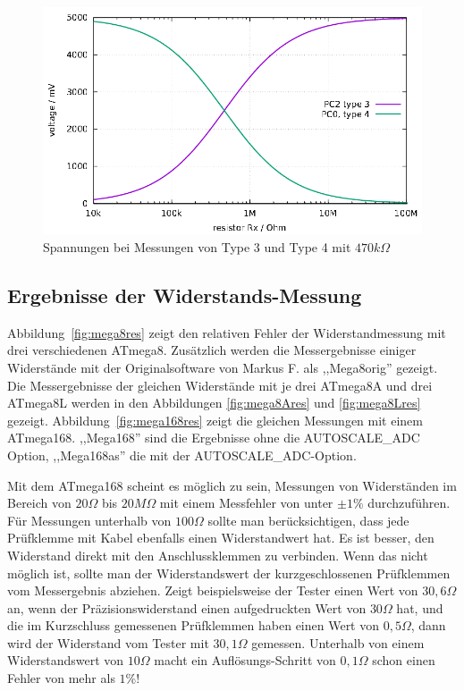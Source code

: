 \begin{figure}[H]
\centering
\includegraphics[width=16cm]{../GNU/RHv.pdf}
\caption{Spannungen bei Messungen von Type 3 und Type 4  mit \(470k\Omega\) }
\label{fig:RHv}
\end{figure}

\subsection{Ergebnisse der Widerstands-Messung}
Abbildung~\ref{fig:mega8res} zeigt den relativen Fehler der Widerstandmessung mit drei verschiedenen ATmega8. 
Zusätzlich werden die Messergebnisse einiger Widerstände mit der Originalsoftware von Markus F. als
,,Mega8orig'' gezeigt.
Die Messergebnisse der gleichen Widerstände mit je drei ATmega8A und drei ATmega8L werden in den Abbildungen
\ref{fig:mega8Ares} und \ref{fig:mega8Lres} gezeigt.
Abbildung~\ref{fig:mega168res} zeigt die gleichen Messungen mit einem ATmega168.
,,Mega168'' sind die Ergebnisse ohne die AUTOSCALE\_ADC Option, ,,Mega168as'' die mit der
 AUTOSCALE\_ADC-Option.

Mit dem ATmega168 scheint es möglich zu sein, Messungen von Widerständen im
Bereich von \(20\Omega\) bis \(20M\Omega\) mit einem Messfehler von unter \(\pm1\%\) durchzuführen.
Für Messungen unterhalb von \(100\Omega\) sollte man berücksichtigen, dass jede Prüfklemme mit Kabel ebenfalls
einen Widerstandwert hat.
Es ist besser, den Widerstand direkt mit den Anschlussklemmen zu verbinden.
Wenn das nicht möglich ist, sollte man der Widerstandswert der kurzgeschlossenen Prüfklemmen vom Messergebnis abziehen.
Zeigt beispielsweise der Tester einen Wert von \(30,6\Omega\) an, wenn der Präzisionswiderstand einen aufgedruckten Wert von \(30\Omega\) hat, 
und die im Kurzschluss gemessenen Prüfklemmen haben einen Wert von \(0,5\Omega\), dann wird der Widerstand vom
Tester mit \(30,1\Omega\) gemessen.
Unterhalb von einem Widerstandswert von \(10\Omega\) macht ein Auflösungs-Schritt von \(0,1\Omega\) schon einen Fehler von mehr als \(1\%\)!

